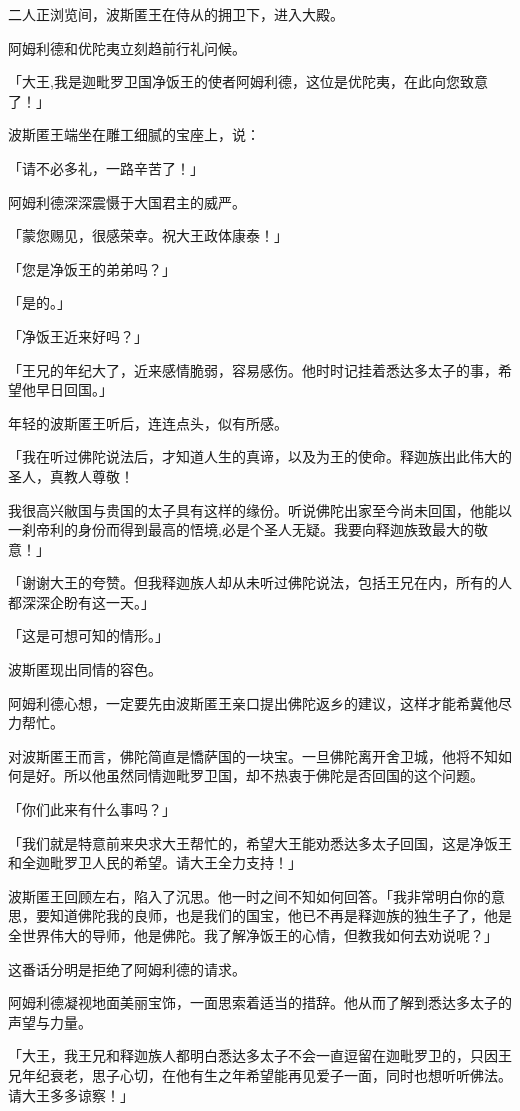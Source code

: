 \documentclass[twoside,openany]{book}
\begin{document}
二人正浏览间，波斯匿王在侍从的拥卫下，进入大殿。

阿姆利德和优陀夷立刻趋前行礼问候。

「大王,我是迦毗罗卫国净饭王的使者阿姆利德，这位是优陀夷，在此向您致意了！」

波斯匿王端坐在雕工细腻的宝座上，说：

「请不必多礼，一路辛苦了！」

阿姆利德深深震慑于大国君主的威严。

「蒙您赐见，很感荣幸。祝大王政体康泰！」

「您是净饭王的弟弟吗？」

「是的。」

「净饭王近来好吗？」

「王兄的年纪大了，近来感情脆弱，容易感伤。他时时记挂着悉达多太子的事，希望他早日回国。」

年轻的波斯匿王听后，连连点头，似有所感。

「我在听过佛陀说法后，才知道人生的真谛，以及为王的使命。释迦族出此伟大的圣人，真教人尊敬！

我很高兴敝国与贵国的太子具有这样的缘份。听说佛陀出家至今尚未回国，他能以一刹帝利的身份而得到最高的悟境,必是个圣人无疑。我要向释迦族致最大的敬意！」

「谢谢大王的夸赞。但我释迦族人却从未听过佛陀说法，包括王兄在内，所有的人都深深企盼有这一天。」

「这是可想可知的情形。」

波斯匿现出同情的容色。

阿姆利德心想，一定要先由波斯匿王亲口提出佛陀返乡的建议，这样才能希冀他尽力帮忙。

对波斯匿王而言，佛陀简直是憍萨国的一块宝。一旦佛陀离开舍卫城，他将不知如何是好。所以他虽然同情迦毗罗卫国，却不热衷于佛陀是否回国的这个问题。

「你们此来有什么事吗？」

「我们就是特意前来央求大王帮忙的，希望大王能劝悉达多太子回国，这是净饭王和全迦毗罗卫人民的希望。请大王全力支持！」

波斯匿王回顾左右，陷入了沉思。他一时之间不知如何回答。「我非常明白你的意思，要知道佛陀我的良师，也是我们的国宝，他已不再是释迦族的独生子了，他是全世界伟大的导师，他是佛陀。我了解净饭王的心情，但教我如何去劝说呢？」

这番话分明是拒绝了阿姆利德的请求。

阿姆利德凝视地面美丽宝饰，一面思索着适当的措辞。他从而了解到悉达多太子的声望与力量。

「大王，我王兄和释迦族人都明白悉达多太子不会一直逗留在迦毗罗卫的，只因王兄年纪衰老，思子心切，在他有生之年希望能再见爱子一面，同时也想听听佛法。请大王多多谅察！」
\end{document}
